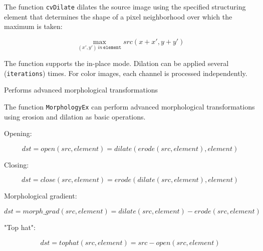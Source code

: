 The function \texttt{cvDilate} dilates the source image using the specified structuring element that determines the shape of a pixel neighborhood over which the maximum is taken:

\[
\max_{(x',y') \, in \, \texttt{element}}src(x+x',y+y')
\]

The function supports the in-place mode. Dilation can be applied several (\texttt{iterations}) times. For color images, each channel is processed independently.

\label{MorphologyEx}

Performs advanced morphological transformations


\begin{description}
\begin{description}
\end{description}
\end{description}

The function \texttt{MorphologyEx} can perform advanced morphological transformations using erosion and dilation as basic operations.

Opening:

\[
dst=open(src,element)=dilate(erode(src,element),element)
\]

Closing:

\[
dst=close(src,element)=erode(dilate(src,element),element)
\]

Morphological gradient:

\[
dst=morph\_grad(src,element)=dilate(src,element)-erode(src,element)
\]

"Top hat":

\[
dst=tophat(src,element)=src-open(src,element)
\]

